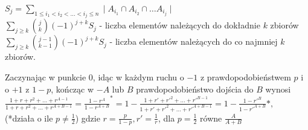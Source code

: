 $S_j = \sum\limits_{1\leq i_1<i_2<\ldots<i_j\leq n} \mid A_{i_1}\cap A_{i_2} \cap \ldots A_{i_j} \mid$\\
$\sum\limits_{j\geq k}{j \choose k}(-1)^{j + k}S_j$ - liczba elementów należących do dokładnie $k$ zbiorów\\
$\sum\limits_{j\geq k}{j - 1 \choose k - 1}(-1)^{j + k}S_j$ - liczba elementów należących do co najmniej $k$ zbiorów.

Zaczynając w punkcie $0$, idąc w każdym ruchu o $-1$ z prawdopodobieństwem $p$ i o $+1$ z $1 - p$, kończąc w $-A$ lub $B$ prawdopodobieństwo dojścia do $B$ wynosi
$\frac{1 + r + r^2 + \ldots + r^{A - 1}}{1 + r + r^2 + \ldots + r^{A + B - 1}} = \frac{1 - r^A}{1 - r^{A + B}}^* = 1 - \frac{1 + r' + r'^2 + \ldots + r'^{B - 1}}{1 + r' + r'^2 + \ldots + r'^{A + B - 1}} = 1 - \frac{1 - r'^B}{1 - r'^{A + B}}*,$ \\ (*działa o ile $p \neq \frac12$) gdzie $r = \frac{p}{1 - p}, r' = \frac1r$, dla $p=\frac12$ równe $\frac{A}{A+B}$


